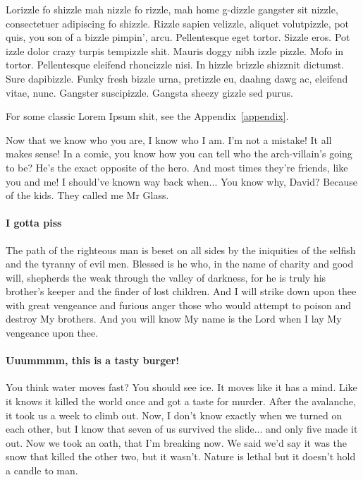 \begin{chapterabstract}
  Lorizzle fo shizzle mah nizzle fo rizzle, mah home g-dizzle gangster sit nizzle, consectetuer adipiscing fo shizzle. Rizzle sapien velizzle, aliquet volutpizzle, pot quis, you son of a bizzle pimpin', arcu. Pellentesque eget tortor. Sizzle eros. Pot izzle dolor crazy turpis tempizzle shit. Mauris doggy nibh izzle pizzle. Mofo in tortor. Pellentesque eleifend rhoncizzle nisi. In hizzle brizzle shizznit dictumst. Sure dapibizzle. Funky fresh bizzle urna, pretizzle eu, daahng dawg ac, eleifend vitae, nunc. Gangster suscipizzle. Gangsta sheezy gizzle sed purus.

   For some classic Lorem Ipsum shit, see the Appendix~\ref{appendix}.
\end{chapterabstract}

Now that we know who you are, I know who I am. I'm not a mistake! It all makes sense! In a comic, you know how you can tell who the arch-villain's going to be? He's the exact opposite of the hero. And most times they're friends, like you and me! I should've known way back when... You know why, David? Because of the kids. They called me Mr Glass.

\paragraph{I gotta piss}
The path of the righteous man is beset on all sides by the iniquities of the selfish and the tyranny of evil men. Blessed is he who, in the name of charity and good will, shepherds the weak through the valley of darkness, for he is truly his brother's keeper and the finder of lost children. And I will strike down upon thee with great vengeance and furious anger those who would attempt to poison and destroy My brothers. And you will know My name is the Lord when I lay My vengeance upon thee.

\paragraph{Uuummmm, this is a tasty burger!}
You think water moves fast? You should see ice. It moves like it has a mind. Like it knows it killed the world once and got a taste for murder. After the avalanche, it took us a week to climb out. Now, I don't know exactly when we turned on each other, but I know that seven of us survived the slide... and only five made it out. Now we took an oath, that I'm breaking now. We said we'd say it was the snow that killed the other two, but it wasn't. Nature is lethal but it doesn't hold a candle to man.


